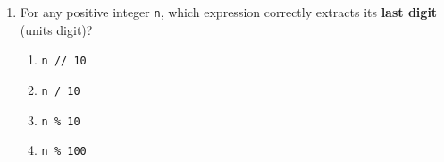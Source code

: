 \documentclass[11pt,a4paper]{article}
\begin{document}
\begin{enumerate}[label=\textbf{Q\arabic*.},leftmargin=2em,itemsep=2pt,topsep=1pt]
\item For any positive integer \texttt{n}, which expression correctly extracts its \textbf{last digit} (units digit)?
\begin{enumerate}[label=\Alph*.,leftmargin=2em]
  \item \texttt{n // 10}
  \item \texttt{n / 10}
  \item \texttt{n \% 10}
  \item \texttt{n \% 100}
\end{enumerate}

\end{enumerate}

\newpage

\end{document}

